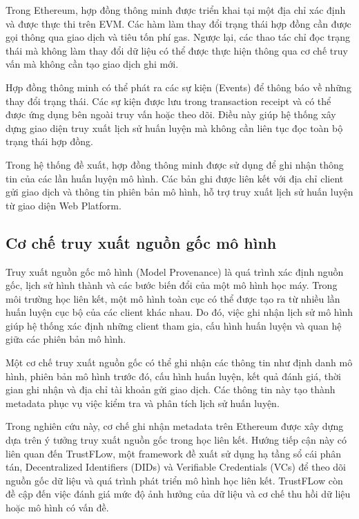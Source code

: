 Trong Ethereum, hợp đồng thông minh được triển khai tại một địa chỉ xác định và được thực thi trên
EVM. Các hàm làm thay đổi trạng thái hợp đồng cần được gọi thông qua giao dịch và tiêu tốn phí gas.
Ngược lại, các thao tác chỉ đọc trạng thái mà không làm thay đổi dữ liệu có thể được thực hiện
thông qua cơ chế truy vấn mà không cần tạo giao dịch ghi mới.

Hợp đồng thông minh có thể phát ra các sự kiện (Events) để thông báo về những thay đổi trạng thái.
Các sự kiện được lưu trong transaction receipt và có thể được ứng dụng bên ngoài truy vấn hoặc theo
dõi. Điều này giúp hệ thống xây dựng giao diện truy xuất lịch sử huấn luyện mà không cần liên tục
đọc toàn bộ trạng thái hợp đồng.

Trong hệ thống đề xuất, hợp đồng thông minh được sử dụng để ghi nhận thông tin của các lần huấn
luyện mô hình. Các bản ghi được liên kết với địa chỉ client gửi giao dịch và thông tin phiên bản mô
hình, hỗ trợ truy xuất lịch sử huấn luyện từ giao diện Web Platform.

\subsection{Cơ chế truy xuất nguồn gốc mô hình}

Truy xuất nguồn gốc mô hình (Model Provenance) là quá trình xác định nguồn gốc, lịch sử hình thành
và các bước biến đổi của một mô hình học máy. Trong môi trường học liên kết, một mô hình toàn cục
có thể được tạo ra từ nhiều lần huấn luyện cục bộ của các client khác nhau. Do đó, việc ghi nhận
lịch sử mô hình giúp hệ thống xác định những client tham gia, cấu hình huấn luyện và quan hệ giữa
các phiên bản mô hình.

Một cơ chế truy xuất nguồn gốc có thể ghi nhận các thông tin như định danh mô hình, phiên bản mô
hình trước đó, cấu hình huấn luyện, kết quả đánh giá, thời gian ghi nhận và địa chỉ tài khoản gửi
giao dịch. Các thông tin này tạo thành metadata phục vụ việc kiểm tra và phân tích lịch sử huấn
luyện.

Trong nghiên cứu này, cơ chế ghi nhận metadata trên Ethereum được xây dựng dựa trên ý tưởng truy
xuất nguồn gốc trong học liên kết. Hướng tiếp cận này có liên quan đến TrustFLow, một framework đề
xuất sử dụng hạ tầng sổ cái phân tán, Decentralized Identifiers (DIDs) và Verifiable Credentials
(VCs) để theo dõi nguồn gốc dữ liệu và quá trình phát triển mô hình học liên kết. TrustFLow còn đề
cập đến việc đánh giá mức độ ảnh hưởng của dữ liệu và cơ chế thu hồi dữ liệu hoặc mô hình có vấn
đề.

